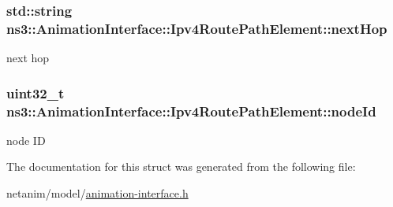 \subsubsection[{\texorpdfstring{next\+Hop}{nextHop}}]{\setlength{\rightskip}{0pt plus 5cm}std\+::string ns3\+::\+Animation\+Interface\+::\+Ipv4\+Route\+Path\+Element\+::next\+Hop}\hypertarget{structns3_1_1AnimationInterface_1_1Ipv4RoutePathElement_a09b11d5ed0d9122d911c9c762c74e2fc}{}\label{structns3_1_1AnimationInterface_1_1Ipv4RoutePathElement_a09b11d5ed0d9122d911c9c762c74e2fc}


next hop 

\subsubsection[{\texorpdfstring{node\+Id}{nodeId}}]{\setlength{\rightskip}{0pt plus 5cm}uint32\+\_\+t ns3\+::\+Animation\+Interface\+::\+Ipv4\+Route\+Path\+Element\+::node\+Id}\hypertarget{structns3_1_1AnimationInterface_1_1Ipv4RoutePathElement_a1c729254285ae30ac49569f7705792c5}{}\label{structns3_1_1AnimationInterface_1_1Ipv4RoutePathElement_a1c729254285ae30ac49569f7705792c5}


node ID 



The documentation for this struct was generated from the following file\+:\begin{DoxyCompactItemize}
\item 
netanim/model/\hyperlink{animation-interface_8h}{animation-\/interface.\+h}\end{DoxyCompactItemize}
